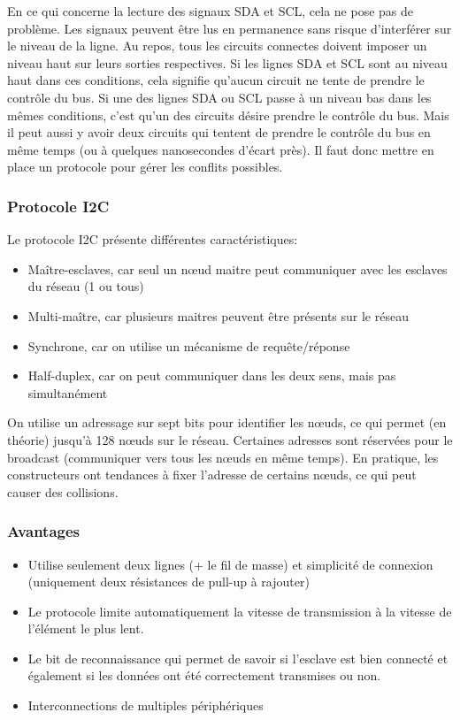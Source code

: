 \documentclass[french,a4paper,12pt]{report}
\begin{document}
En ce qui concerne la lecture des signaux SDA et SCL, cela ne pose pas de problème. Les signaux peuvent être lus en permanence sans risque d'interférer sur le niveau de la ligne.
Au repos, tous les circuits connectes doivent imposer un niveau haut sur leurs sorties respectives. Si les lignes SDA et SCL sont au niveau haut dans ces conditions, cela signifie qu'aucun circuit ne tente de prendre le contrôle du bus. Si une des lignes SDA ou SCL passe à un niveau bas dans les mêmes conditions, c'est qu'un des circuits désire prendre le contrôle du bus. Mais il peut aussi y avoir deux circuits qui tentent de prendre le contrôle du bus en même temps (ou à quelques nanosecondes d'écart près). Il faut donc mettre en place un protocole pour gérer les conflits possibles.

   		\subsubsection{Protocole I2C}
	Le protocole I2C présente différentes caractéristiques:
 
			\begin{itemize}
			\item Maître-esclaves, car seul un nœud maitre peut communiquer avec les esclaves du réseau (1 ou tous)
			\item Multi-maître, car plusieurs maitres peuvent être présents sur le réseau
			\item Synchrone, car on utilise un mécanisme de requête/réponse
			\item Half-duplex, car on peut communiquer dans les deux sens, mais pas simultanément
			\end{itemize}
 
On utilise un adressage sur sept bits pour identifier les nœuds, ce qui permet (en théorie) jusqu’à 128 nœuds sur le réseau. Certaines adresses sont réservées pour le broadcast (communiquer vers tous les nœuds en même temps). En pratique, les constructeurs ont tendances à fixer l’adresse de certains nœuds, ce qui peut causer des collisions.
 
 
  		\subsubsection{Avantages}
			\begin{itemize}
			\item Utilise seulement deux lignes (+ le fil de masse) et simplicité de connexion (uniquement deux résistances de pull-up à rajouter) 
			\item Le protocole limite automatiquement la vitesse de transmission à la vitesse de l’élément le plus lent. 
			\item Le bit de reconnaissance qui permet de savoir si l’esclave est bien connecté et également si les données ont été correctement transmises ou non. 
			\item Interconnections de multiples périphériques
			\end{itemize}
 
\end{document}
